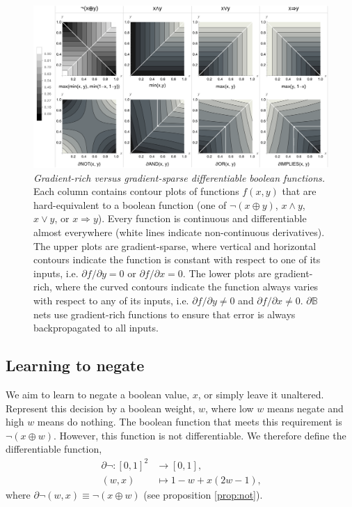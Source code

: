 \documentclass{article} %
\begin{document}
\begin{figure}[t]
	\centering
	\includegraphics[trim=0pt 0pt 0pt 0pt, clip, width=1.0\textwidth]{logic-gates.png}
	\caption{{\em Gradient-rich versus gradient-sparse differentiable boolean functions.} Each column contains contour plots of functions $f(x,y)$ that are hard-equivalent to a boolean function (one of $\neg(x \oplus y)$, $x \wedge y$, $x \vee y$, or $x \Rightarrow y$). Every function is continuous and differentiable almost everywhere (white lines indicate non-continuous derivatives). The upper plots are gradient-sparse, where vertical and horizontal contours indicate the function is constant with respect to one of its inputs, i.e. $\partial f/\partial y = 0$ or $\partial f/\partial x = 0$. The lower plots are gradient-rich, where the curved contours indicate the function always varies with respect to any of its inputs, i.e. $\partial f/\partial y \neq 0$ and $\partial f/\partial x \neq 0$. $\partial \mathbb{B}$ nets use gradient-rich functions to ensure that error is always backpropagated to all inputs.} 
	\label{fig:gradient-rich}
\end{figure}

\subsection{Learning to negate}

We aim to learn to negate a boolean value, $x$, or simply leave it unaltered. Represent this decision by a boolean weight, $w$, where low $w$ means negate and high $w$ means do nothing. The boolean function that meets this requirement is $\neg(x \oplus w)$. However, this function is not differentiable. We therefore define the differentiable function,
	\begin{equation*}
	\begin{aligned}
	\partial \neg: [0, 1]^{2} &\to [0,1], \\
	(w, x) &\mapsto 1 - w + x (2w - 1)\text{,}
	\end{aligned}
	\end{equation*}
where $\partial \neg(w, x) \equiv \neg(x \oplus w)$ (see proposition \ref{prop:not}).
\end{document}
